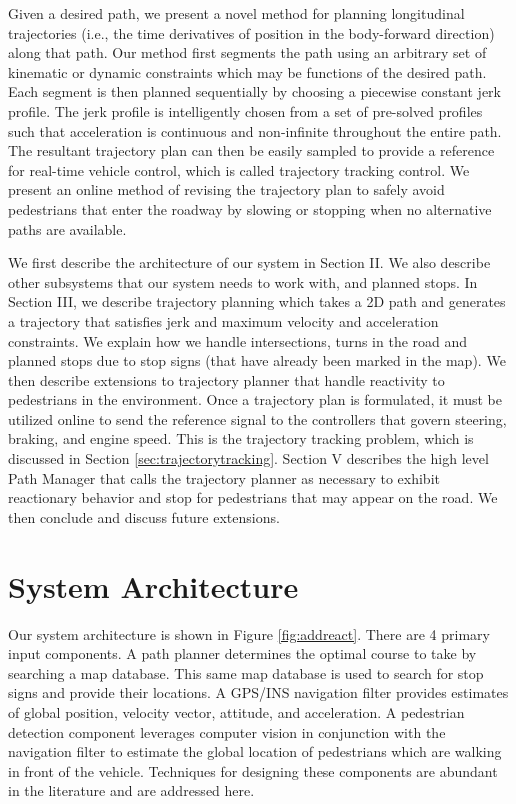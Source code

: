 \documentclass[letterpaper, 10 pt, conference]{ieeeconf}  %
\begin{document}
Given a desired path, we present a novel method for planning longitudinal trajectories (i.e., the time derivatives of position in the body-forward direction) along that path.
Our method first segments the path using an arbitrary set of kinematic or dynamic constraints which may be functions of the desired path.
Each segment is then planned sequentially by choosing a piecewise constant jerk profile.
The jerk profile is intelligently chosen from a set of pre-solved profiles such that acceleration is continuous and non-infinite throughout the entire path.
The resultant trajectory plan can then be easily sampled to provide a reference for real-time vehicle control, which is called trajectory tracking control.
We present an online method of revising the trajectory plan to safely avoid pedestrians that enter the roadway by slowing or stopping when no alternative paths are available.

We first describe the architecture of our system in Section II. We also describe other subsystems that our system needs to work with, and planned stops.
In Section III, we describe trajectory planning which takes a 2D path and generates a trajectory that satisfies jerk and maximum velocity and acceleration constraints. 
We explain how we handle intersections, turns in the road and planned stops due to stop signs (that have already been marked in the map).
We then describe extensions to trajectory planner that handle reactivity to pedestrians in the environment. 
Once a trajectory plan is formulated, it must be utilized online to send the reference signal to the controllers that govern steering, braking, and engine speed.
This is the trajectory tracking problem, which is discussed in Section \ref{sec:trajectorytracking}.
Section V describes the high level Path Manager that calls the trajectory planner as necessary to 
exhibit reactionary behavior and stop for pedestrians that may appear on the road.
We then conclude and discuss future extensions.


\section{System Architecture} \label{sec:systemarchirectureg}


Our system architecture is shown in Figure \ref{fig:addreact}.
There are 4 primary input components.
A path planner determines the optimal course to take by searching a map database.
This same map database is used to search for stop signs and provide their locations.
A GPS/INS navigation filter provides estimates of global position, velocity vector, attitude, and acceleration.
A pedestrian detection component \cite{Gepperth2013,Gepperth2014} leverages computer vision in conjunction with the navigation filter to estimate the global location of pedestrians which are walking in front of the vehicle.
Techniques for designing these components are abundant in the literature and are addressed here.
\end{document}
